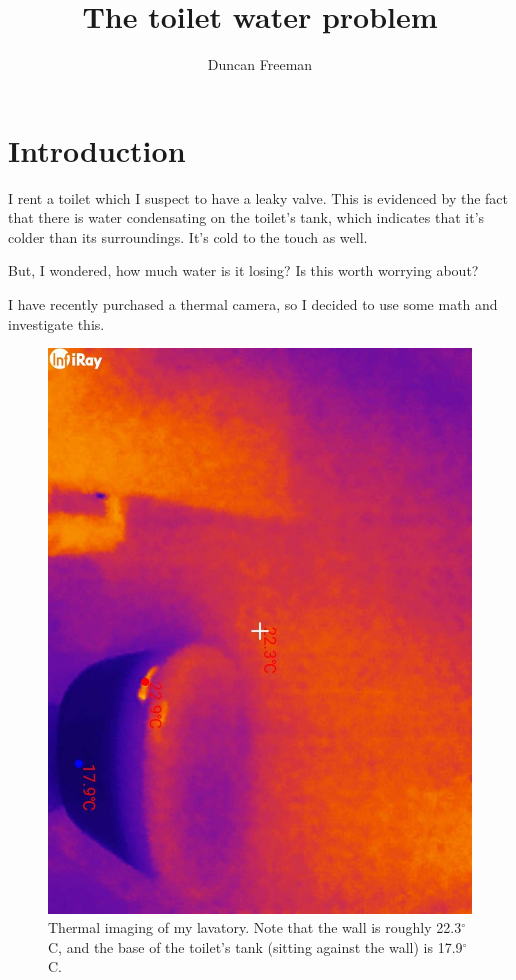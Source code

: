 \documentclass[12pt]{article}
\title{The toilet water problem}
\author{Duncan Freeman}
\begin{document}
\maketitle
\section*{Introduction}
I rent a toilet which I suspect to have a leaky valve. This is evidenced by the fact that there is water condensating on the toilet's tank, which indicates that it's colder than its surroundings. It's cold to the touch as well.

But, I wondered, how much water is it losing? Is this worth worrying about?

I have recently purchased a thermal camera, so I decided to use some math and investigate this.

\begin{figure}
\begin{center}
    \includegraphics[angle=90,scale=0.2]{toilet_thermals.jpg}
    \caption{Thermal imaging of my lavatory. Note that the wall is roughly 22.3$^\circ$C, and the base of the toilet's tank (sitting against the wall) is 17.9$^\circ$C.}
\end{center}
\end{figure}
\end{document}

